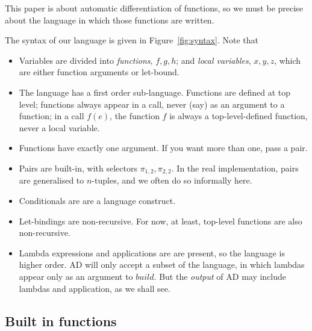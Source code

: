 \documentclass[sigplan,review]{acmart}
\newcommand{\deriv}{\partial}  %
\newcommand{\gradf}[1]{\deriv\hspace{-0.15mm} #1}  %
\newcommand{\sel}[2]{\pi_{#1,#2}}
\newcommand{\buildfun}{\mathit{build}}
\newcommand{\simon}[1]{}
\newcommand{\awf}[1]{}
\begin{document}
This paper is about automatic differentiation of functions, so we must be precise about
the language in which those functions are written.

The syntax of our language is given in Figure~\ref{fig:syntax}.
Note that
\begin{itemize}
\item  Variables are divided into \emph{functions}, $f,g,h$; and \emph{local variables}, $x,y,z$,
  which are either function arguments or let-bound.
\item
  The language has a first order sub-language.  Functions are defined at top level;
  functions always appear in a call, never (say) as an argument to a
  function; in a call $f(e)$, the function $f$ is always a
  top-level-defined function, never a local variable.  \awf{at some point we should say where this restriction is needed}

\item Functions have exactly one argument. If you want more than one, pass a pair.

\item Pairs are built-in, with selectors $\sel{1}{2}, \sel{2}{2}$.
  In the real implementation, pairs are generalised to $n$-tuples, and we often do so informally here.

\item Conditionals are are a language construct. \simon{Treating ``if'' as a function
  just didn't work; in particular $\gradf{if}$ needed a linear-map version of
  ``if'' and once we have that we might as well build ``if'' in.  Anyway,
  conditionals are very fundamental, so it's unsurprising.}

\item Let-bindings are non-recursive. For now, at least, top-level
  functions are also non-recursive.  \simon{I think that top-level
    recursive functions might be OK, but I don't want to think about
    that yet.}

\item Lambda expressions and applications are are present, so the language
  is higher order.  AD will only accept a subset of the language, in
  which lambdas appear only as an argument to $\buildfun$.  But the
  \emph{output} of AD may include lambdas and application, as we shall see.
  \end{itemize}

\subsection{Built in functions}
\end{document}
